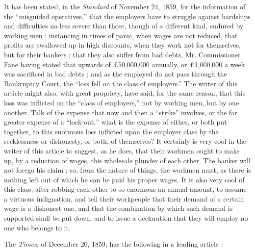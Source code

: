 It has been stated, in the \textit{Standard} of November 24, 1859, for
the information of the ``misguided operatives,'' that the employers have
to struggle against hardships and difficulties no less severe than those,
though of a different kind, endured by working men ; instancing in times
of panic, when wages are not reduced, that profits are swallowed up in
high discounts, when they work not for themselves, but for their bankers
; that they also suffer from bad debts, Mr. Commissioner Fane having
stated that upwards of £50,000,000 annually, or £1,000,000 a week was
sacrificed in bad debts ; and as the employed do not pass through the
Bankruptcy Court, the ``loss fell on the class of employers.'' The
writer of this article might also, with great propriety, have said, for
the same reason, that this loss was inflicted on the ``class of
employers,'' not by working men, but by one another. Talk of the expense
that now and then a ``strike'' involves, or the far greater expense of a
``lock-out,'' what is the expense of either, or both put together, to
this enormous loss inflicted upon the employer class by the recklessness
or dishonesty, or both, of themselves? It certainly is very cool in the
writer of this article to suggest, as he does, that their workmen ought
to make up, by a reduction of wages, this wholesale plunder of each
other. The banker will not forego his claim ; so, from the nature of
things, the workmen must, as there is nothing left out of which he can
be paid his proper wages. It is also very cool of this class, after
robbing each other to so enormous an annual amount, to assume a virtuous
indignation, and tell their workpeople that their demand of a certain
wage is a dishonest one, and that the combination by which such demand
is supported shall be put down, and to issue a declaration that they
will employ no one who belongs to it.

The \textit{Times}, of December 20, 1859, has the following in a leading
article :

